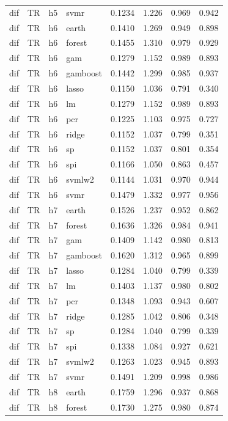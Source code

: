 \begin{ThreePartTable}
\begin{longtable}[t]{llclcccc}
dif & TR & h5 & svmr & 0.1234 & 1.226 & 0.969 & 0.942\\
\addlinespace
dif & TR & h6 & earth & 0.1410 & 1.269 & 0.949 & 0.898\\
dif & TR & h6 & forest & 0.1455 & 1.310 & 0.979 & 0.929\\
dif & TR & h6 & gam & 0.1279 & 1.152 & 0.989 & 0.893\\
dif & TR & h6 & gamboost & 0.1442 & 1.299 & 0.985 & 0.937\\
dif & TR & h6 & lasso & 0.1150 & 1.036 & 0.791 & 0.340\\
dif & TR & h6 & lm & 0.1279 & 1.152 & 0.989 & 0.893\\
dif & TR & h6 & pcr & 0.1225 & 1.103 & 0.975 & 0.727\\
dif & TR & h6 & ridge & 0.1152 & 1.037 & 0.799 & 0.351\\
dif & TR & h6 & sp & 0.1152 & 1.037 & 0.801 & 0.354\\
dif & TR & h6 & spi & 0.1166 & 1.050 & 0.863 & 0.457\\
dif & TR & h6 & svmlw2 & 0.1144 & 1.031 & 0.970 & 0.944\\
dif & TR & h6 & svmr & 0.1479 & 1.332 & 0.977 & 0.956\\
\addlinespace
dif & TR & h7 & earth & 0.1526 & 1.237 & 0.952 & 0.862\\
dif & TR & h7 & forest & 0.1636 & 1.326 & 0.984 & 0.941\\
dif & TR & h7 & gam & 0.1409 & 1.142 & 0.980 & 0.813\\
dif & TR & h7 & gamboost & 0.1620 & 1.312 & 0.965 & 0.899\\
dif & TR & h7 & lasso & 0.1284 & 1.040 & 0.799 & 0.339\\
dif & TR & h7 & lm & 0.1403 & 1.137 & 0.980 & 0.802\\
dif & TR & h7 & pcr & 0.1348 & 1.093 & 0.943 & 0.607\\
dif & TR & h7 & ridge & 0.1285 & 1.042 & 0.806 & 0.348\\
dif & TR & h7 & sp & 0.1284 & 1.040 & 0.799 & 0.339\\
dif & TR & h7 & spi & 0.1338 & 1.084 & 0.927 & 0.621\\
dif & TR & h7 & svmlw2 & 0.1263 & 1.023 & 0.945 & 0.893\\
dif & TR & h7 & svmr & 0.1491 & 1.209 & 0.998 & 0.986\\
\addlinespace
dif & TR & h8 & earth & 0.1759 & 1.296 & 0.937 & 0.868\\
dif & TR & h8 & forest & 0.1730 & 1.275 & 0.980 & 0.874\\

\end{longtable}
\end{ThreePartTable}
